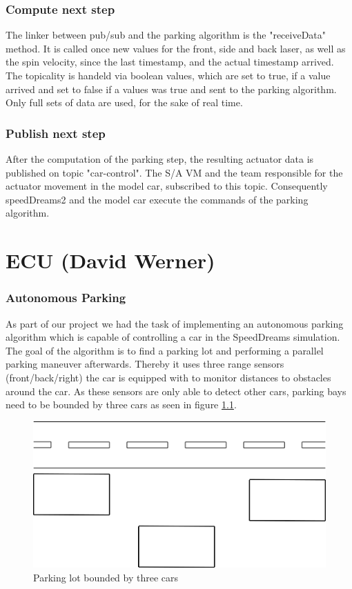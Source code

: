 \documentclass[paper=a4, fontsize=11pt]{scrreprt}
\begin{document}
  \subsection{Compute next step}
The linker between pub/sub and the parking algorithm is the "receiveData" method. It is called once new values for the front, side and back laser, as well as the spin velocity, since the last timestamp, and the actual timestamp arrived. The topicality is handeld via boolean values, which are set to true, if a value arrived and set to false if a values was true and sent to the parking algorithm. Only full sets of data are used, for the sake of real time.
  \subsection{Publish next step}
After the computation of the parking step, the resulting actuator data is published on topic "car-control". The S/A VM and the team responsible for the actuator movement in the model car, subscribed to this topic. Consequently speedDreams2 and the model car execute the commands of the parking algorithm.
\chapter{ECU (David Werner)}
\subsection{Autonomous Parking}
As part of our project we had the task of implementing an autonomous parking algorithm which is capable of controlling a car in the SpeedDreams simulation. 
The goal of the algorithm is to find a parking lot and performing a parallel parking maneuver afterwards. Thereby it uses three range sensors (front/back/right) the car is equipped with to monitor distances to obstacles around the car. As these sensors are only able to detect other cars, parking bays need to be bounded by three cars as seen in figure \ref{parking_lot}.
\begin{figure}[H]
\centering
\includegraphics[scale=0.35]{images_ecu/parking_lot.png}
\caption{\tiny Parking lot bounded by three cars}
\label{parking_lot}
\end{figure}
\end{document}

